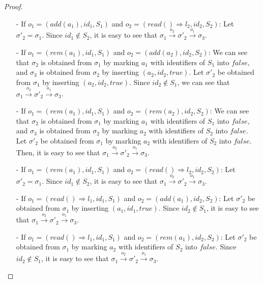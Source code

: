{\begin {proof}
\begin{itemize}
\begin{itemize}
    \item[-] If $o_1 = (\mathit{add}(a_1),\mathit{id}_1,S_1)$ and $o_2 = (\mathit{read}() \Rightarrow l_2,\mathit{id}_2,S_2)$: Let $\sigma'_2 = \sigma_1$. Since $\mathit{id}_1 \notin S_2$, it is easy to see that $\sigma_1 {\xrightarrow{o_2}} \sigma'_2 {\xrightarrow{o_1}} \sigma_3$.

    \item[-] If $o_1 = (\mathit{rem}(a_1),\mathit{id}_1,S_1)$ and $o_2 = (\mathit{add}(a_2),\mathit{id}_2,S_2)$: We can see that $\sigma_2$ is obtained from $\sigma_1$ by marking $a_1$ with identifiers of $S_1$ into $\mathit{false}$, and $\sigma_3$ is obtained from $\sigma_2$ by inserting $(a_2,\mathit{id}_2,\mathit{true})$. Let $\sigma'_2$ be obtained from $\sigma_1$ by inserting $(a_2,\mathit{id}_2,\mathit{true})$. Since $\mathit{id}_2 \notin S_1$, we can see that $\sigma_1 {\xrightarrow{o_2}} \sigma'_2 {\xrightarrow{o_1}} \sigma_3$.

    \item[-] If $o_1 = (\mathit{rem}(a_1),\mathit{id}_1,S_1)$ and $o_2 = (\mathit{rem}(a_2),\mathit{id}_2,S_2)$: We can see that $\sigma_2$ is obtained from $\sigma_1$ by marking $a_1$ with identifiers of $S_1$ into $\mathit{false}$, and $\sigma_3$ is obtained from $\sigma_2$ by marking $a_2$ with identifiers of $S_2$ into $\mathit{false}$. Let $\sigma'_2$ be obtained from $\sigma_1$ by marking $a_2$ with identifiers of $S_2$ into $\mathit{false}$. Then, it is easy to see that $\sigma_1 {\xrightarrow{o_2}} \sigma'_2 {\xrightarrow{o_1}} \sigma_3$.

    \item[-] If $o_1 = (\mathit{rem}(a_1),\mathit{id}_1,S_1)$ and $o_2 = (\mathit{read}() \Rightarrow l_2,\mathit{id}_2,S_2)$: Let $\sigma'_2 = \sigma_1$. Since $\mathit{id}_1 \notin S_2$, it is easy to see that $\sigma_1 {\xrightarrow{o_2}} \sigma'_2 {\xrightarrow{o_1}} \sigma_3$.

    \item[-] If $o_1 = (\mathit{read}() \Rightarrow l_1,\mathit{id}_1,S_1)$ and $o_2 = (\mathit{add}(a_1),\mathit{id}_2,S_2)$: Let $\sigma'_2$ be obtained from $\sigma_1$ by inserting $(a_1,\mathit{id}_1,\mathit{true})$. Since $\mathit{id}_2 \notin S_1$, it is easy to see that $\sigma_1 {\xrightarrow{o_2}} \sigma'_2 {\xrightarrow{o_1}} \sigma_3$.

    \item[-] If $o_1 = (\mathit{read}() \Rightarrow l_1,\mathit{id}_1,S_1)$ and $o_2 = (\mathit{rem}(a_1),\mathit{id}_2,S_2)$: Let $\sigma'_2$ be obtained from $\sigma_1$ by marking $a_2$ with identifiers of $S_2$ into $\mathit{false}$. Since $\mathit{id}_2 \notin S_1$, it is easy to see that $\sigma_1 {\xrightarrow{o_2}} \sigma'_2 {\xrightarrow{o_1}} \sigma_3$.


\end{itemize}
\end{itemize}
\end{proof}}
